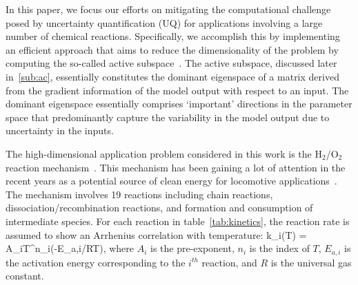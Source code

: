 In this paper, we focus our efforts on mitigating the computational challenge posed by uncertainty
quantification (UQ) for applications involving a large number of chemical reactions. Specifically, we
accomplish this by implementing an efficient approach that aims to reduce the dimensionality
of the problem by computing the so-called active subspace~\cite{Constantine:2015}. 
The active subspace, discussed later in~\ref{sub:ac}, essentially constitutes the dominant
eigenspace of a matrix derived from the gradient information of the model output with respect
to an input. The dominant eigenspace essentially comprises `important' directions in the parameter
space that predominantly capture the variability in the model output due to uncertainty in the
inputs. 

The high-dimensional application problem considered in this work is the H$_2$/O$_2$
reaction mechanism~\cite{Yetter:1991}. This mechanism has been gaining a lot of attention in the
recent years as a potential source of clean energy for locomotive applications~\cite{Das:1996}.   
The mechanism involves 19 reactions including chain reactions, dissociation/recombination reactions, and
formation and consumption of intermediate species. For each reaction in table~\ref{tab:kinetics}, 
the reaction rate is assumed to show an Arrhenius correlation with temperature:
%
\be
k_i(T) = A_iT^{n_i}\exp(-E_{a,i}/RT), 
\label{eq:rate}
\ee
%
where $A_i$ is the pre-exponent, $n_i$ is the index of $T$, $E_{a,i}$ is the
activation energy corresponding to the $i^{th}$ reaction, and $R$ is the
universal gas constant.  

